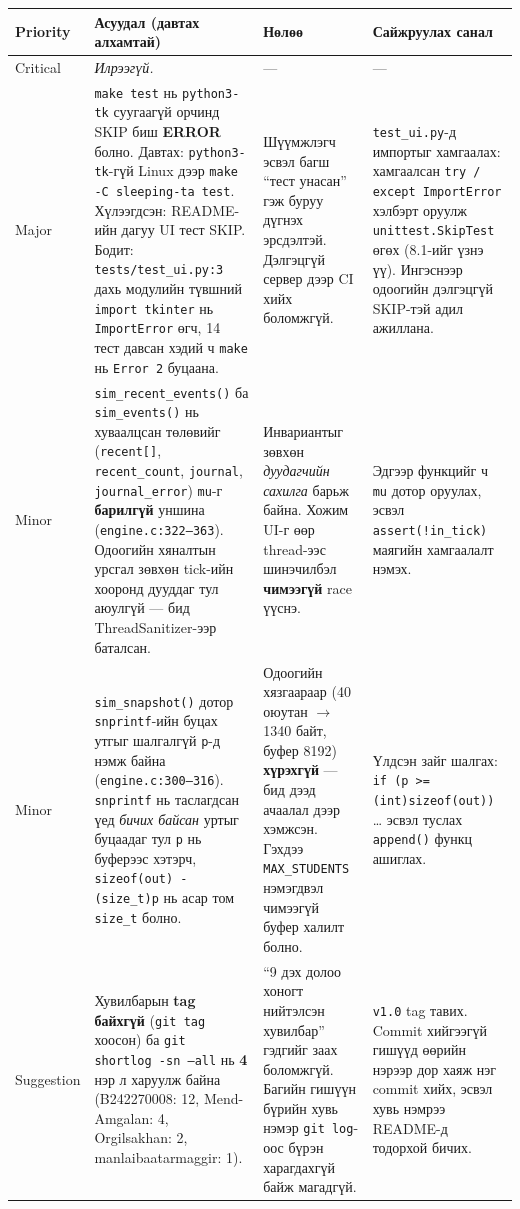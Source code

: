 \documentclass[11pt,a4paper]{article}
\begin{document}
\begin{center}
\small
\begin{tabular}{L{1.9cm}L{5.4cm}L{3.4cm}L{3.5cm}}
\toprule
Priority & Асуудал (давтах алхамтай) & Нөлөө & Сайжруулах санал \\
\midrule
Critical & \emph{Илрээгүй.} & --- & --- \\[8pt]
Major &
\texttt{make test} нь \texttt{python3-tk} суугаагүй орчинд SKIP биш
\textbf{ERROR} болно. Давтах: \texttt{python3-tk}-гүй Linux дээр
\texttt{make -C sleeping-ta test}. Хүлээгдсэн: README-ийн дагуу UI тест
SKIP. Бодит: \texttt{tests/test\_ui.py:3} дахь модулийн түвшний
\texttt{import tkinter} нь \texttt{ImportError} өгч, 14 тест давсан хэдий ч
\texttt{make} нь \texttt{Error 2} буцаана. &
Шүүмжлэгч эсвэл багш ``тест унасан'' гэж буруу дүгнэх эрсдэлтэй.
Дэлгэцгүй сервер дээр CI хийх боломжгүй. &
\texttt{test\_ui.py}-д импортыг хамгаалах:
хамгаалсан \texttt{try / except ImportError} хэлбэрт
оруулж \texttt{unittest.SkipTest} өгөх (8.1-ийг үзнэ үү).
Ингэснээр одоогийн дэлгэцгүй SKIP-тэй адил ажиллана. \\[8pt]
Minor &
\texttt{sim\_recent\_events()} ба \texttt{sim\_events()} нь хуваалцсан
төлөвийг (\texttt{recent[]}, \texttt{recent\_count}, \texttt{journal},
\texttt{journal\_error}) \texttt{mu}-г \textbf{барилгүй} уншина
(\texttt{engine.c:322--363}). Одоогийн хяналтын урсгал зөвхөн tick-ийн
хооронд дууддаг тул аюулгүй --- бид ThreadSanitizer-ээр баталсан. &
Инвариантыг зөвхөн \emph{дуудагчийн сахилга} барьж байна. Хожим UI-г
өөр thread-ээс шинэчилбэл \textbf{чимээгүй} race үүснэ. &
Эдгээр функцийг ч \texttt{mu} дотор оруулах, эсвэл
\texttt{assert(!in\_tick)} маягийн хамгаалалт нэмэх. \\[8pt]
Minor &
\texttt{sim\_snapshot()} дотор \texttt{snprintf}-ийн буцах утгыг шалгалгүй
\texttt{p}-д нэмж байна (\texttt{engine.c:300--316}). \texttt{snprintf} нь
таслагдсан үед \emph{бичих байсан} уртыг буцаадаг тул \texttt{p} нь
буферээс хэтэрч, \texttt{sizeof(out) - (size\_t)p} нь асар том \texttt{size\_t}
болно. &
Одоогийн хязгаараар (40 оюутан $\to$ 1340 байт, буфер 8192) \textbf{хүрэхгүй}
--- бид дээд ачаалал дээр хэмжсэн. Гэхдээ \texttt{MAX\_STUDENTS} нэмэгдвэл
чимээгүй буфер халилт болно. &
Үлдсэн зайг шалгах:
\texttt{if (p >= (int)sizeof(out))} \dots{} эсвэл туслах
\texttt{append()} функц ашиглах. \\[8pt]
Suggestion &
Хувилбарын \textbf{tag байхгүй} (\texttt{git tag} хоосон) ба
\texttt{git shortlog -sn --all} нь \textbf{4} нэр л харуулж байна
(B242270008: 12, Mend-Amgalan: 4, Orgilsakhan: 2, manlaibaatarmaggir: 1). &
``9 дэх долоо хоногт нийтэлсэн хувилбар'' гэдгийг заах боломжгүй. Багийн
гишүүн бүрийн хувь нэмэр \texttt{git log}-оос бүрэн харагдахгүй байж
магадгүй. &
\texttt{v1.0} tag тавих. Commit хийгээгүй гишүүд өөрийн нэрээр дор хаяж нэг
commit хийх, эсвэл хувь нэмрээ README-д тодорхой бичих. \\
\bottomrule
\end{tabular}
\end{center}
\end{document}
